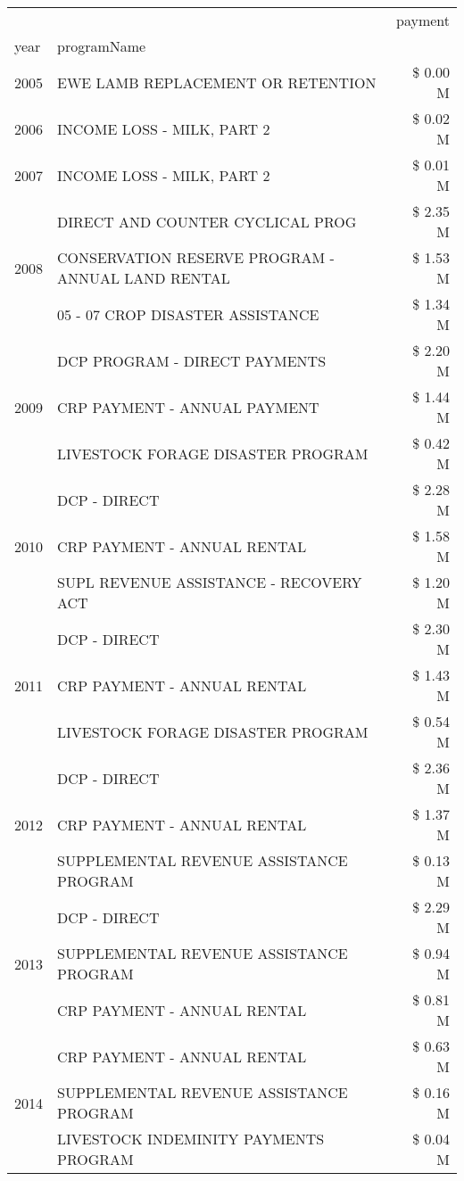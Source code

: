 \begin{tabular}{llr}
\toprule
 &  & payment \\
year & programName &  \\
\midrule
2005 & EWE LAMB REPLACEMENT OR RETENTION & \$ 0.00 M \\
\cline{1-3}
2006 & INCOME LOSS - MILK, PART 2 & \$ 0.02 M \\
\cline{1-3}
2007 & INCOME LOSS - MILK, PART 2 & \$ 0.01 M \\
\cline{1-3}
\multirow[t]{3}{*}{2008} & DIRECT AND COUNTER CYCLICAL PROG & \$ 2.35 M \\
 & CONSERVATION RESERVE PROGRAM - ANNUAL LAND RENTAL & \$ 1.53 M \\
 & 05 - 07 CROP DISASTER ASSISTANCE & \$ 1.34 M \\
\cline{1-3}
\multirow[t]{3}{*}{2009} & DCP PROGRAM - DIRECT PAYMENTS & \$ 2.20 M \\
 & CRP PAYMENT - ANNUAL PAYMENT & \$ 1.44 M \\
 & LIVESTOCK FORAGE DISASTER  PROGRAM & \$ 0.42 M \\
\cline{1-3}
\multirow[t]{3}{*}{2010} & DCP - DIRECT & \$ 2.28 M \\
 & CRP PAYMENT - ANNUAL RENTAL & \$ 1.58 M \\
 & SUPL REVENUE ASSISTANCE - RECOVERY ACT & \$ 1.20 M \\
\cline{1-3}
\multirow[t]{3}{*}{2011} & DCP - DIRECT & \$ 2.30 M \\
 & CRP PAYMENT - ANNUAL RENTAL & \$ 1.43 M \\
 & LIVESTOCK FORAGE DISASTER PROGRAM & \$ 0.54 M \\
\cline{1-3}
\multirow[t]{3}{*}{2012} & DCP - DIRECT & \$ 2.36 M \\
 & CRP PAYMENT - ANNUAL RENTAL & \$ 1.37 M \\
 & SUPPLEMENTAL REVENUE ASSISTANCE PROGRAM & \$ 0.13 M \\
\cline{1-3}
\multirow[t]{3}{*}{2013} & DCP - DIRECT & \$ 2.29 M \\
 & SUPPLEMENTAL REVENUE ASSISTANCE PROGRAM & \$ 0.94 M \\
 & CRP PAYMENT - ANNUAL RENTAL & \$ 0.81 M \\
\cline{1-3}
\multirow[t]{3}{*}{2014} & CRP PAYMENT - ANNUAL RENTAL & \$ 0.63 M \\
 & SUPPLEMENTAL REVENUE ASSISTANCE PROGRAM & \$ 0.16 M \\
 & LIVESTOCK INDEMINITY PAYMENTS PROGRAM & \$ 0.04 M \\

\end{tabular}

